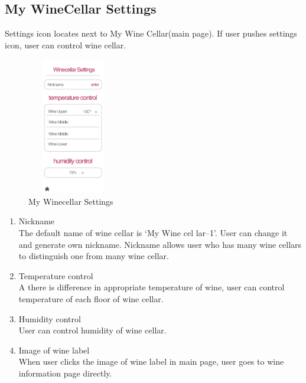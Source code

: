 \documentclass[sigconf, nonacm]{acmart}
\begin{document}
\subsection{My WineCellar Settings}
Settings icon locates next to My Wine Cellar(main page).
If user pushes settings icon, user can control wine cellar.
\begin{figure}
  \centering
  \includegraphics[width=4cm, height=6cm]{setting.png}
  \caption{My Winecellar Settings}
  \label{fig:wine cellar settings}
\end{figure}
\begin{enumerate}
    \item Nickname\\
    The default name of wine cellar is ‘My Wine cel
lar–1’. User can change it and generate own nickname.
Nickname allows user who has many wine cellars to
distinguish one from many wine cellar.
    \item Temperature control\\
    A there is difference in appropriate temperature of
wine, user can control temperature of each floor of
wine cellar.
    \item Humidity control\\
    User can control humidity of wine cellar.
    \item Image of wine label\\
    When user clicks the image of wine label in main page,
user goes to wine information page directly.
\end{enumerate}


\end{document}
